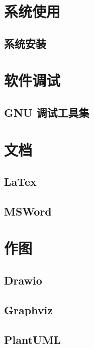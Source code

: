 \chapter{系统使用}
\section{系统安装}

\chapter{软件调试}
\section{GNU 调试工具集}

\chapter{文档}
\section{LaTex}
\section{MSWord}

\chapter{作图}
\section{Drawio}
\section{Graphviz}
\section{PlantUML}
